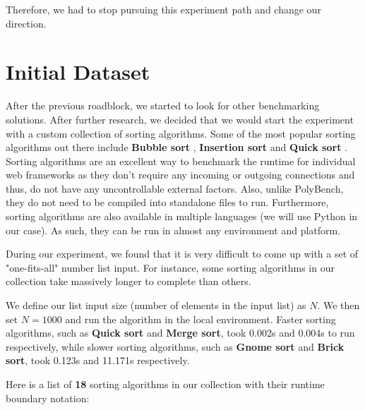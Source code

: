 Therefore, we had to stop pursuing this experiment path and change our direction.

\bigskip
\section{Initial Dataset}

After the previous roadblock, we started to look for other benchmarking solutions. After further research, we decided that we would start the experiment with a custom collection of sorting algorithms. Some of the most popular sorting algorithms out there include \textbf{Bubble sort} \cite{exp47}, \textbf{Insertion sort} \cite{exp48} and \textbf{Quick sort} \cite{exp49}. Sorting algorithms are an excellent way to benchmark the runtime for individual web frameworks as they don't require any incoming or outgoing connections and thus, do not have any uncontrollable external factors. Also, unlike PolyBench, they do not need to be compiled into standalone files to run. Furthermore, sorting algorithms are also available in multiple languages (we will use Python in our case). As such, they can be run in almost any environment and platform.

During our experiment, we found that it is very difficult to come up with a set of "one-fits-all" number list input. For instance, some sorting algorithms in our collection take massively longer to complete than others.

We define our list input size (number of elements in the input list) as \(N\). We then set \(N = 1000\) and run the algorithm in the local environment. Faster sorting algorithms, such as \textbf{Quick sort} and \textbf{Merge sort}, took 0.002s and 0.004s to run respectively, while slower sorting algorithms, such as \textbf{Gnome sort} and \textbf{Brick sort}, took 0.123s and 11.171s respectively.

Here is a list of \textbf{18} sorting algorithms in our collection with their runtime boundary notation:

